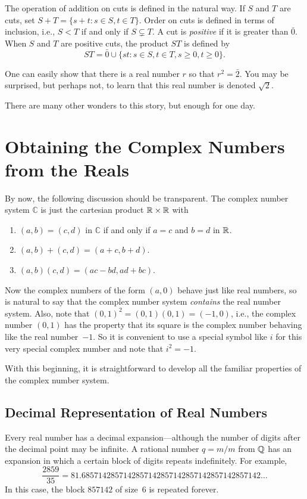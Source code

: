 The operation of addition on cuts is defined in the natural
way.  If $S$ and $T$ are cuts, set $S+T=\{s+t:s\in S, t\in T\}$.
Order on cuts is defined in terms of inclusion, i.e., $S<T$ if and
only if $S\subsetneq T$.  A cut is \textit{positive} if it
is greater than $\bar{0}$.  When $S$ and $T$ are positive
cuts, the product $ST$ is defined by
\[
ST= \bar{0}\cup\{st:s\in S, t\in T, s\ge0, t\ge 0\}.
\]

One can easily show that there is a real number $r$ so that
$r^2=\bar{2}$.  You may be surprised, but perhaps not, to learn
that this real number is denoted $\sqrt2$.

There are many other wonders to this story, but enough for
one day.

\section{Obtaining the Complex Numbers from the Reals}\label{s:background:complex}

By now, the following discussion should be transparent.
The complex number system $\mathbb{C}$ is just the cartesian product
$\mathbb{R}\times\mathbb{R}$ with 
\begin{enumerate}
\item $(a,b) = (c,d)$ in $\mathbb{C}$ if and only if $a=c$ and $b=d$
in $\mathbb{R}$.
\item $(a,b)+(c,d)=(a+c,b+d)$.
\item $(a,b)(c,d)=(ac-bd, ad+bc)$.
\end{enumerate}

Now the complex numbers of the form $(a,0)$ behave just like
real numbers, so is natural to say that the complex number system
\textit{contains} the real number system.  Also, note that
$(0,1)^2=(0,1)(0,1)=(-1,0)$, i.e., the complex number $(0,1)$ has the
property that its square is the complex number behaving like the
real number~$-1$.  So it is convenient to use a special symbol like
$i$ for this very special complex number and note that $i^2=-1$.

With this beginning, it is straightforward to develop all the
familiar properties of the complex number system.

\subsection{Decimal Representation of Real Numbers}

Every real number has a decimal expansion---although the
number of digits after the decimal point may be infinite.
A rational number $q=m/m$ from $\mathbb{Q}$ has an expansion
in which a certain block of digits repeats indefinitely.
For example, \[
\frac{2859}{35} = 81.6857142857142857142857142857142857142857142\dots
\]
In this case, the block $857142$ of size~$6$ is repeated forever.

